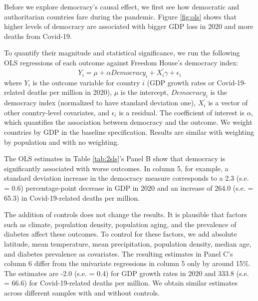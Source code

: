 Before we explore democracy's causal effect, we first see how democratic and authoritarian countries fare during the pandemic. Figure \ref{fig:ols} shows that higher levels of democracy are associated with bigger GDP loss in 2020 and more deaths from Covid-19. 

To quantify their magnitude and statistical significance, we run the following OLS regressions of each outcome against Freedom House's democracy index: 
    \begin{equation}
    \label{eqn:ols}
        Y_i = \mu + \alpha Democracy_i +  X^{'}_i \gamma + \epsilon_i
    \end{equation}
\noindent where $Y_i$ is the outcome variable for country $i$ (GDP growth rates or Covid-19-related deaths per million in 2020), $\mu$ is the intercept, $Democracy_i$ is the democracy index (normalized to have standard deviation one), $X^{'}_i$ is a vector of other country-level covariates, and $\epsilon_i$ is a residual. The coefficient of interest is $\alpha$, which quantifies the association between democracy and the outcome. We weight countries by GDP in the baseline specification. Results are similar with weighting by population and with no weighting. 

The OLS estimates in Table \ref{tab:2sls}'s Panel B show that democracy is significantly associated with worse outcomes. In column 5, for example, a standard deviation increase in the democracy measure corresponds to a 2.3 (s.e. = 0.6) percentage-point decrease in GDP in 2020 and an increase of 264.0 (s.e. = 65.3) in Covid-19-related deaths per million. 

The addition of controls does not change the results. It is plausible that factors such as climate, population density, population aging, and the prevalence of diabetes affect these outcomes. To control for these factors, we add absolute latitude, mean temperature, mean precipitation, population density, median age, and diabetes prevalence as covariates. The resulting estimates in Panel C's column 6 differ from the univariate regressions in column 5 only by around 15\%. The estimates are -2.0 (s.e. = 0.4) for GDP growth rates in 2020 and 333.8 (s.e. = 66.6) for Covid-19-related deaths per million. We obtain similar estimates across different samples with and without controls.
